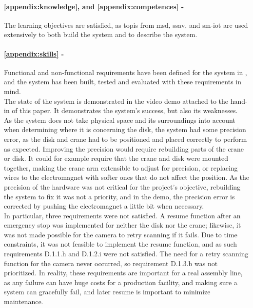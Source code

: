 \paragraph{\ref{appendix:knowledge}, and \ref{appendix:competences} -} The learning objectives are satisfied, as topis from \acrshort{msd}, \acrshort{ssav}, and \acrshort{sm-iot} are used extensively to both build the system and to describe the system.

\paragraph{\ref{appendix:skills} -} Functional and non-functional requirements have been defined for the system in , and the system has been built, tested and evaluated with these requirements in mind.\\

The state of the system is demonstrated in the video demo attached to the hand-in of this paper. It demonstrates the system's success, but also its weaknesses.\\

As the system does not take physical space and its surroundings into account when determining where it is concerning the disk, the system had some precision error, as the disk and crane had to be positioned and placed correctly to perform as expected. Improving the precision would require rebuilding parts of the crane or disk. It could for example require that the crane and disk were mounted together, making the crane arm extensible to adjust for precision, or replacing wires to the electromagnet with softer ones that do not affect the position. As the precision of the hardware was not critical for the project's objective, rebuilding the system to fix it was not a priority, and in the demo, the precision error is corrected by pushing the electromagnet a little bit when necessary.\\

In particular, three requirements were not satisfied. A resume function after an emergency stop was implemented for neither the disk nor the crane; likewise, it was not made possible for the camera to retry scanning if it fails.
Due to time constraints, it was not feasible to implement the resume function, and as such requirements D.1.1.h and D.1.2.i were not satisfied. The need for a retry scanning function for the camera never occurred, so requirement D.1.3.b was not prioritized. In reality, these requirements are important for a real assembly line, as any failure can have huge costs for a production facility, and making sure a system can gracefully fail, and later resume is important to minimize maintenance.

